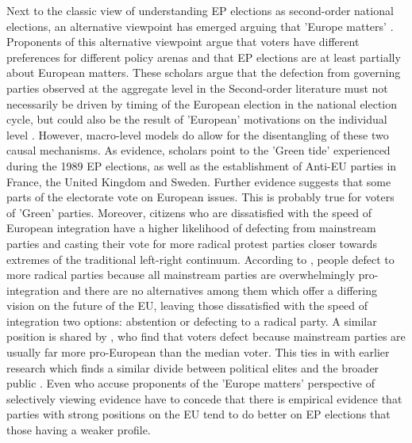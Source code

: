Next to the classic view of understanding EP elections as second-order national elections, an alternative viewpoint has emerged arguing that 'Europe matters' \cite{Hix2007}. Proponents of this alternative viewpoint argue that voters have different preferences for different policy arenas and that EP elections are at least partially about European matters. These scholars argue that the defection from governing parties observed at the aggregate level in the Second-order literature must not necessarily be driven by timing of the European election in the national election cycle, but could also be the result of 'European' motivations on the individual level \cite{Hobolt2009a}. However, macro-level models do allow for the disentangling of these two causal mechanisms. As evidence, scholars point to the 'Green tide' experienced during the 1989 EP elections, as well as the establishment of Anti-EU parties in France, the United Kingdom and Sweden. Further evidence suggests that some parts of the electorate vote on European issues. This is probably true for voters of 'Green' parties. Moreover, citizens who are dissatisfied with the speed of European integration have a higher likelihood of defecting from mainstream parties and casting their vote for more radical protest parties closer towards extremes of the traditional left-right continuum. According to , people defect to more radical parties  because all mainstream parties are overwhelmingly pro-integration and there are no alternatives among them which offer a differing vision on the future of the EU, leaving those dissatisfied with the speed of integration two options: abstention or defecting to a radical party. A similar position is shared by , who find that voters defect because mainstream parties are usually far more pro-European than the median voter. This ties in with earlier research which finds a similar divide between political elites and the broader public \cite{Hooghe2002}. Even  who accuse proponents of the 'Europe matters' perspective of selectively viewing evidence have to concede that there is empirical evidence that parties with strong positions on the EU tend to do better on EP elections that those having a weaker profile.

